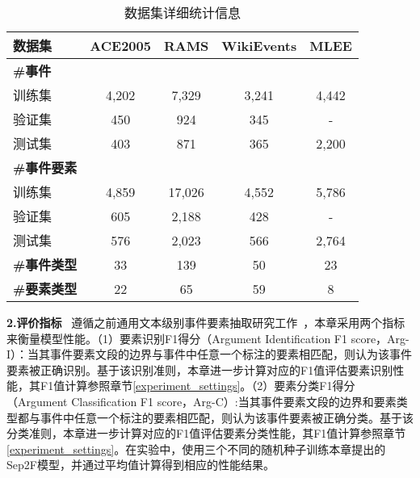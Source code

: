 \begin{table}[htp]
\centering
\caption{数据集详细统计信息} 
\begin{tabular}{l|cccc}
\toprule
 数据集 & ACE2005 & RAMS & WikiEvents & MLEE  \\
 \midrule
 \textbf{\#事件} &  &  &  &  \\
 训练集 & 4,202 & 7,329 & 3,241 & 4,442  \\
 验证集 & 450 & 924 & 345 & -  \\
 测试集 & 403 & 871 & 365 & 2,200  \\
 \midrule
 \textbf{\#事件要素} &  &  &  &  \\
 训练集 & 4,859 & 17,026 & 4,552 & 5,786 \\
 验证集 & 605 & 2,188 & 428 & - \\
 测试集 & 576 & 2,023 & 566  & 2,764 \\
 \midrule
 \textbf{\#事件类型} & 33 & 139 & 50 & 23  \\
 \textbf{\#要素类型} & 22 & 65 & 59 & 8 \\
\bottomrule
\end{tabular}
\label{statistics}
\end{table}

\textbf{2.评价指标}~
遵循之前通用文本级别事件要素抽取研究工作~\cite{ma2022prompt,he2023revisiting}，本章采用两个指标来衡量模型性能。（1）要素识别F1得分（Argument Identification F1 score，Arg-I）：当其事件要素文段的边界与事件中任意一个标注的要素相匹配，则认为该事件要素被正确识别。基于该识别准则，本章进一步计算对应的F1值评估要素识别性能，其F1值计算参照章节\ref{experiment_settings}。（2）要素分类F1得分（Argument Classification F1 score，Arg-C）:当其事件要素文段的边界和要素类型都与事件中任意一个标注的要素相匹配，则认为该事件要素被正确分类。基于该分类准则，本章进一步计算对应的F1值评估要素分类性能，其F1值计算参照章节\ref{experiment_settings}。在实验中，使用三个不同的随机种子训练本章提出的Sep2F模型，并通过平均值计算得到相应的性能结果。

